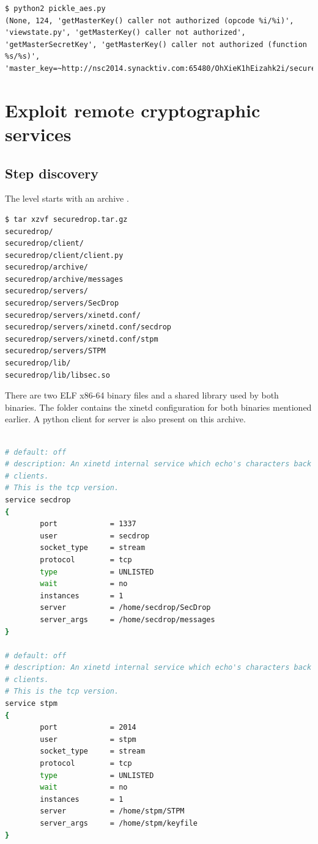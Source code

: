 \documentclass[a4paper]{article}
\begin{document}
\begin{lstlisting}[caption={Escape the Unpickler (see listing \ref{Pickle_aes})},numbers=none,style=colortilde]
$ python2 pickle_aes.py
(None, 124, 'getMasterKey() caller not authorized (opcode %i/%i)', 'viewstate.py', 'getMasterKey() caller not authorized', 'getMasterSecretKey', 'getMasterKey() caller not authorized (function %s/%s)', 'master_key=~http://nsc2014.synacktiv.com:65480/OhXieK1hEizahk2i/securedrop.tar.gz~')
\end{lstlisting}



\newpage

\section{Exploit remote cryptographic services}
\subsection{Step discovery}
The level starts with an archive .

\begin{lstlisting}[language=bash,caption={Extraction of the step 3 archive},numbers=none,style=colortilde]
$ tar xzvf securedrop.tar.gz 
securedrop/
securedrop/client/
securedrop/client/client.py
securedrop/archive/
securedrop/archive/messages
securedrop/servers/
securedrop/servers/SecDrop
securedrop/servers/xinetd.conf/
securedrop/servers/xinetd.conf/secdrop
securedrop/servers/xinetd.conf/stpm
securedrop/servers/STPM
securedrop/lib/
securedrop/lib/libsec.so
\end{lstlisting}

There are two ELF x86-64 binary files and a shared library used by both binaries. The folder  contains the xinetd configuration for both binaries mentioned earlier. A python client for  server is also present on this archive. 

\begin{lstlisting}[language=bash,caption={Xinetd configuration},numbers=none,style=colortilde]

# default: off
# description: An xinetd internal service which echo's characters back to
# clients.
# This is the tcp version.
service secdrop
{
        port            = 1337
        user            = secdrop
        socket_type     = stream
        protocol        = tcp
        type            = UNLISTED
        wait            = no
        instances       = 1
        server          = /home/secdrop/SecDrop 
        server_args     = /home/secdrop/messages
}

# default: off
# description: An xinetd internal service which echo's characters back to
# clients.
# This is the tcp version.
service stpm
{
        port            = 2014
        user            = stpm
        socket_type     = stream
        protocol        = tcp
        type            = UNLISTED
        wait            = no
        instances       = 1
        server          = /home/stpm/STPM
        server_args     = /home/stpm/keyfile
}
\end{lstlisting}
\end{document}

